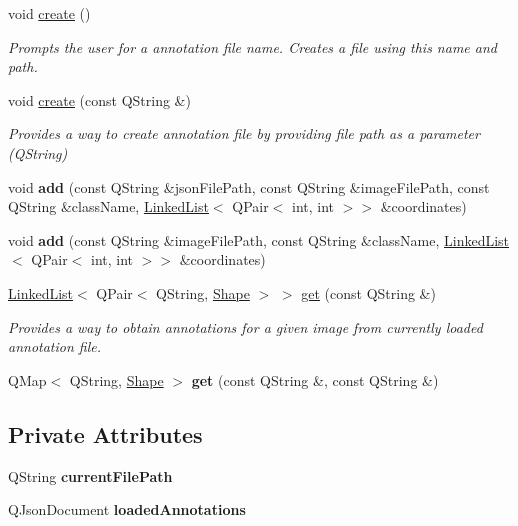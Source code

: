 \begin{DoxyCompactItemize}
void \hyperlink{classAnnotationModel_ac4c6850c8d0f704c3bf5bef486992690}{create} ()
\begin{DoxyCompactList}\small\item\em Prompts the user for a annotation file name. Creates a file using this name and path. \end{DoxyCompactList}\item 
void \hyperlink{classAnnotationModel_ac5062c8663670a312132929f16e4be64}{create} (const Q\+String \&)
\begin{DoxyCompactList}\small\item\em Provides a way to create annotation file by providing file path as a parameter (Q\+String) \end{DoxyCompactList}\item 
\mbox{\label{classAnnotationModel_a4b6bbcae3cae275254085c857609413e}} 
void {\bfseries add} (const Q\+String \&json\+File\+Path, const Q\+String \&image\+File\+Path, const Q\+String \&class\+Name, \hyperlink{classLinkedList}{Linked\+List}$<$ Q\+Pair$<$ int, int $>$$>$ \&coordinates)
\item 
\mbox{\label{classAnnotationModel_a58af7fa7e9af062292bcb0ce531f95a6}} 
void {\bfseries add} (const Q\+String \&image\+File\+Path, const Q\+String \&class\+Name, \hyperlink{classLinkedList}{Linked\+List}$<$ Q\+Pair$<$ int, int $>$$>$ \&coordinates)
\item 
\hyperlink{classLinkedList}{Linked\+List}$<$ Q\+Pair$<$ Q\+String, \hyperlink{classLinkedList}{Shape} $>$ $>$ \hyperlink{classAnnotationModel_a94c840624e8ad25d8c7d5abf1c0e255b}{get} (const Q\+String \&)
\begin{DoxyCompactList}\small\item\em Provides a way to obtain annotations for a given image from currently loaded annotation file. \end{DoxyCompactList}\item 
\mbox{\label{classAnnotationModel_a880c414938859f37f7690d90ac1ebe10}} 
Q\+Map$<$ Q\+String, \hyperlink{classLinkedList}{Shape} $>$ {\bfseries get} (const Q\+String \&, const Q\+String \&)
\end{DoxyCompactItemize}
\subsection*{Private Attributes}
\begin{DoxyCompactItemize}
\item 
\mbox{\label{classAnnotationModel_a204571a62dfdc60a405528ddc1db2a61}} 
Q\+String {\bfseries current\+File\+Path}
\item 
\mbox{\label{classAnnotationModel_aee0be27919046fe9a7009023c15d99a9}} 
Q\+Json\+Document {\bfseries loaded\+Annotations}
\end{DoxyCompactItemize}


